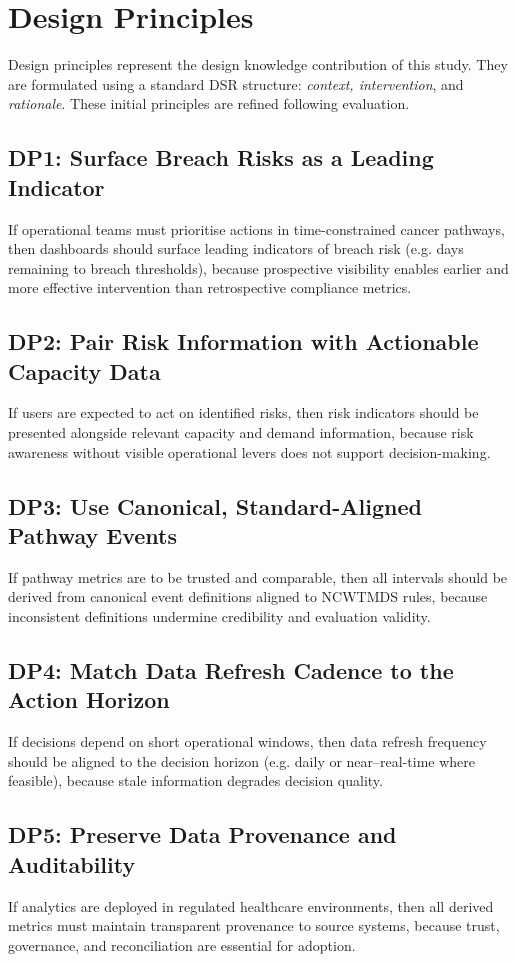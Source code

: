 \section{Design Principles} \label{DP}
Design principles represent the design knowledge contribution of this study. They are formulated using a standard DSR structure: \emph{context, intervention}, and \emph{rationale}. These initial principles are refined following evaluation.

\subsection*{DP1: Surface Breach Risks as a Leading Indicator}
If operational teams must prioritise actions in time-constrained cancer pathways, then dashboards should surface leading indicators of breach risk (e.g. days remaining to breach thresholds), because prospective visibility enables earlier and more effective intervention than retrospective compliance metrics. 

\subsection*{DP2: Pair Risk Information with Actionable Capacity Data}
If users are expected to act on identified risks, then risk indicators should be presented alongside relevant capacity and demand information, because risk awareness without visible operational levers does not support decision-making.

\subsection*{DP3: Use Canonical, Standard-Aligned Pathway Events}
If pathway metrics are to be trusted and comparable, then all intervals should be derived from canonical event definitions aligned to NCWTMDS rules, because inconsistent definitions undermine credibility and evaluation validity. 

\subsection*{DP4: Match Data Refresh Cadence to the Action Horizon}
If decisions depend on short operational windows, then data refresh frequency should be aligned to the decision horizon (e.g. daily or near–real-time where feasible), because stale information degrades decision quality.

\subsection*{DP5: Preserve Data Provenance and Auditability}
If analytics are deployed in regulated healthcare environments, then all derived metrics must maintain transparent provenance to source systems, because trust, governance, and reconciliation are essential for adoption.

